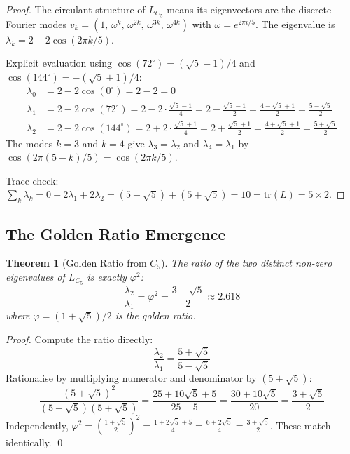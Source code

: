 \documentclass[11pt,a4paper]{article}
\newtheorem{theorem}{Theorem}[section]
\theoremstyle{definition}
\begin{document}
\begin{proof}
The circulant structure of $L_{C_5}$ means its eigenvectors are the discrete Fourier modes $v_k = (1,\, \omega^k,\, \omega^{2k},\, \omega^{3k},\, \omega^{4k})$ with $\omega = e^{2\pi i/5}$. The eigenvalue is $\lambda_k = 2 - 2\cos(2\pi k/5)$.

Explicit evaluation using $\cos(72^{\circ}) = (\sqrt{5}-1)/4$ and $\cos(144^{\circ}) = -(\sqrt{5}+1)/4$:
\begin{align}
\lambda_0 &= 2 - 2\cos(0^{\circ}) = 2 - 2 = 0 \\
\lambda_1 &= 2 - 2\cos(72^{\circ}) = 2 - 2\cdot\frac{\sqrt{5}-1}{4} = 2 - \frac{\sqrt{5}-1}{2} = \frac{4 - \sqrt{5} + 1}{2} = \frac{5-\sqrt{5}}{2} \\
\lambda_2 &= 2 - 2\cos(144^{\circ}) = 2 + 2\cdot\frac{\sqrt{5}+1}{4} = 2 + \frac{\sqrt{5}+1}{2} = \frac{4 + \sqrt{5} + 1}{2} = \frac{5+\sqrt{5}}{2}
\end{align}
The modes $k=3$ and $k=4$ give $\lambda_3 = \lambda_2$ and $\lambda_4 = \lambda_1$ by $\cos(2\pi(5-k)/5) = \cos(2\pi k/5)$.

Trace check: $\sum_k \lambda_k = 0 + 2\lambda_1 + 2\lambda_2 = (5 - \sqrt{5}) + (5 + \sqrt{5}) = 10 = \mathrm{tr}(L) = 5 \times 2$.
\end{proof}

\subsection{The Golden Ratio Emergence}

\begin{theorem}[Golden Ratio from $C_5$]
\label{S1:thm:golden_ratio}
The ratio of the two distinct non-zero eigenvalues of $L_{C_5}$ is exactly $\varphi^2$:
\begin{equation}
\frac{\lambda_2}{\lambda_1} = \varphi^2 = \frac{3 + \sqrt{5}}{2} \approx 2.618
\label{S1:eq:golden_ratio}
\end{equation}
where $\varphi = (1+\sqrt{5})/2$ is the golden ratio.
\end{theorem}

\begin{proof}
Compute the ratio directly:
\begin{equation}
\frac{\lambda_2}{\lambda_1} = \frac{5 + \sqrt{5}}{5 - \sqrt{5}}
\end{equation}
Rationalise by multiplying numerator and denominator by $(5 + \sqrt{5})$:
\begin{equation}
\frac{(5+\sqrt{5})^2}{(5-\sqrt{5})(5+\sqrt{5})} = \frac{25 + 10\sqrt{5} + 5}{25 - 5} = \frac{30 + 10\sqrt{5}}{20} = \frac{3+\sqrt{5}}{2}
\end{equation}
Independently, $\varphi^2 = \left(\frac{1+\sqrt{5}}{2}\right)^{\!2} = \frac{1+2\sqrt{5}+5}{4} = \frac{6+2\sqrt{5}}{4} = \frac{3+\sqrt{5}}{2}$. These match identically. \qed
\end{proof}
\end{document}
